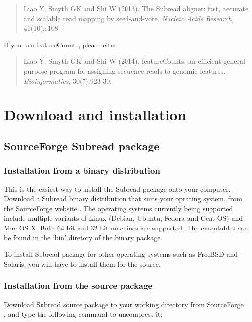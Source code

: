 \documentclass[12pt]{report}
\newcommand{\Subread}{\textsf{Subread}}
\newcommand{\featureCounts}{\textsf{featureCounts}}
\begin{document}
\begin{quote}
Liao Y, Smyth GK and Shi W (2013). The Subread aligner: fast, accurate and scalable read mapping by seed-and-vote. \emph{Nucleic Acids Research}, 41(10):e108.
\\
{ }
\end{quote}

{\noindent If you use \featureCounts, please cite:}
\begin{quote}
Liao Y, Smyth GK and Shi W (2014). featureCounts: an efficient general purpose program for assigning sequence reads to genomic features. \emph{Bioinformatics}, 30(7):923-30.
\\
{}
\end{quote}


\section{Download and installation}

\subsection{SourceForge {\Subread} package}

\subsubsection{Installation from a binary distribution}

This is the easiest way to install the {\Subread} package onto your computer.
Download a {\Subread} binary distribution that suits your oprating system, from the SourceForge website {}. The operating systems currently being supported include multiple variants of Linux (Debian, Ubuntu, Fedora and Cent OS) and Mac OS X. Both 64-bit and 32-bit machines are supported. The executables can be found in the `bin' diretory of the binary package.

To install {\Subread} package for other operating systems such as FreeBSD and Solaris, you will have to install them for the source.


\subsubsection{Installation from the source package}

Download {\Subread} source package to your working directory from SourceForge \\
{}, and type the following command to uncompress it:\\
\end{document}
